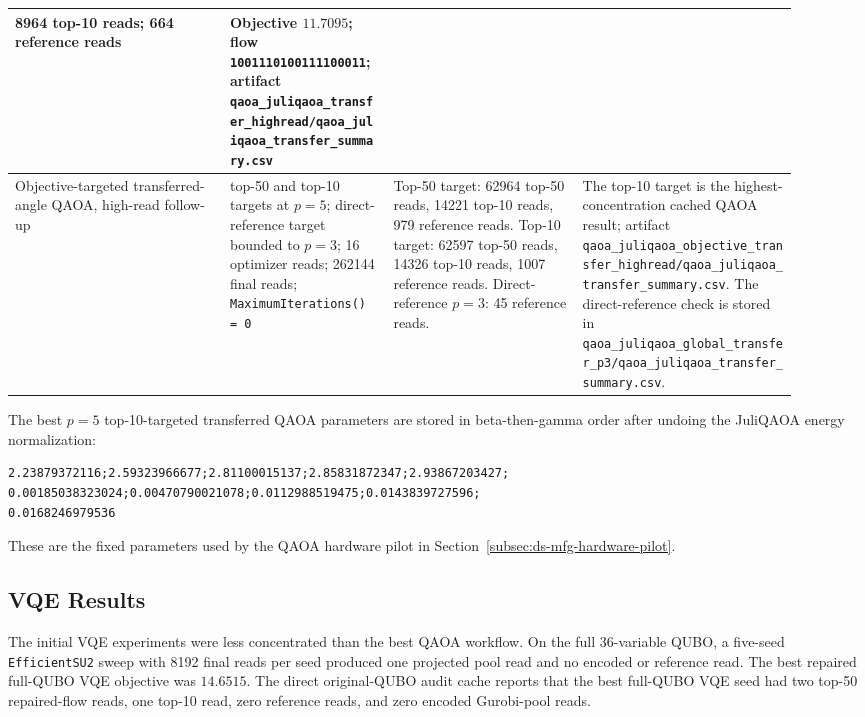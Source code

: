 \begin{table}[t]
\begin{tabular}{p{0.25\linewidth}p{0.19\linewidth}p{0.22\linewidth}p{0.25\linewidth}}
8964 top-10 reads; 664 reference reads & Objective $11.7095$; flow
\texttt{1001110100111100011}; artifact
\texttt{qaoa\_juliqaoa\_transfer\_highread/qaoa\_juliqaoa\_transfer\_summary.csv} \\
\hline
Objective-targeted transferred-angle QAOA, high-read follow-up & top-50 and
top-10 targets at $p=5$; direct-reference target bounded to $p=3$; 16 optimizer
reads; 262144 final reads; \texttt{MaximumIterations() = 0} & Top-50 target:
62964 top-50 reads, 14221 top-10 reads, 979 reference reads. Top-10 target: 62597
top-50 reads, 14326 top-10 reads, 1007 reference reads. Direct-reference $p=3$: 45
reference reads. & The top-10 target is the highest-concentration cached QAOA result;
artifact
\texttt{qaoa\_juliqaoa\_objective\_transfer\_highread/qaoa\_juliqaoa\_transfer\_summary.csv}.
The direct-reference check is stored in
\texttt{qaoa\_juliqaoa\_global\_transfer\_p3/qaoa\_juliqaoa\_transfer\_summary.csv}. \\
\hline
\end{tabular}
\end{table}

The best $p=5$ top-10-targeted transferred QAOA parameters are stored in
beta-then-gamma order after undoing the JuliQAOA energy normalization:
\begin{verbatim}
2.23879372116;2.59323966677;2.81100015137;2.85831872347;2.93867203427;
0.00185038323024;0.00470790021078;0.0112988519475;0.0143839727596;
0.0168246979536
\end{verbatim}
These are the fixed parameters used by the QAOA hardware pilot in
Section~\ref{subsec:ds-mfg-hardware-pilot}.

\subsection{VQE Results}
\label{subsec:ds-mfg-vqe-results}

The initial VQE experiments were less concentrated than the best QAOA workflow.
On the full 36-variable QUBO, a five-seed \texttt{EfficientSU2} sweep with
8192 final reads per seed produced one projected pool read and no encoded or
reference read. The best repaired full-QUBO VQE objective was $14.6515$.
The direct original-QUBO audit cache reports that the best full-QUBO VQE seed
had two top-50 repaired-flow reads, one top-10 read, zero reference reads, and zero
encoded Gurobi-pool reads.

